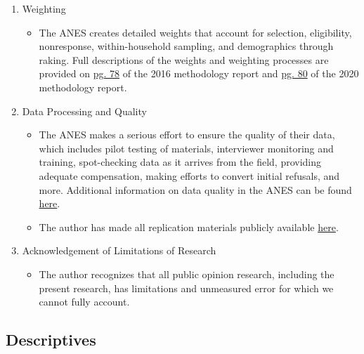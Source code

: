 \documentclass[12pt]{article}
\begin{document}
\begin{appendices}
\begin{refsection}
\begin{enumerate}
	\item Weighting
	\begin{itemize}
		\item The ANES creates detailed weights that account for selection, eligibility, nonresponse, within-household sampling, and demographics through raking. Full descriptions of the weights and weighting processes are provided on \href{https://electionstudies.org/wp-content/uploads/2016/02/anes_timeseries_2016_methodology_report.pdf}{pg. 78} of the 2016 methodology report and \href{https://electionstudies.org/wp-content/uploads/2022/08/anes_timeseries_2020_methodology_report.pdf}{pg. 80} of the 2020 methodology report. 
	\end{itemize}
	
	\item Data Processing and Quality
	\begin{itemize}
		\item The ANES makes a serious effort to ensure the quality of their data, which includes pilot testing of materials, interviewer monitoring and training, spot-checking data as it arrives from the field, providing adequate compensation, making efforts to convert initial refusals, and more. Additional information on data quality in the ANES can be found \href{https://electionstudies.org/data-quality/}{here}. 
		\item The author has made all replication materials publicly available \href{https://github.com/maxallamong/Alienation}{here}.
	\end{itemize}
	
	\item Acknowledgement of Limitations of Research
	\begin{itemize}
		\item The author recognizes that all public opinion research, including the present research, has limitations and unmeasured error for which we cannot fully account. 
	\end{itemize}
\end{enumerate}
\doublespacing




\subsection{Descriptives}\label{si:desc} %


\end{refsection}
\end{appendices}
\end{document}
